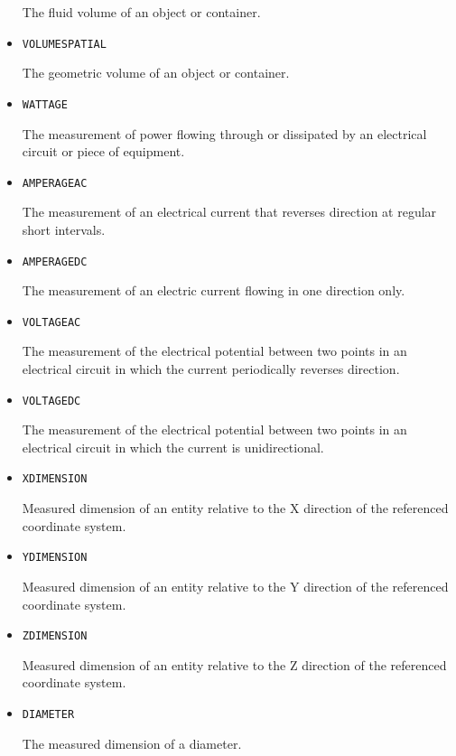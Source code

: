 \begin{itemize}
The fluid volume of an object or container.


\item \texttt{VOLUME\textunderscore SPATIAL}  

The geometric volume of an object or container.


\item \texttt{WATTAGE}  

The measurement of power flowing through or dissipated by an electrical circuit or piece of equipment.


\item \texttt{AMPERAGE\textunderscore AC}  

The measurement of an electrical current that reverses direction at regular short intervals.


\item \texttt{AMPERAGE\textunderscore DC}  

The measurement of an electric current flowing in one direction only.


\item \texttt{VOLTAGE\textunderscore AC}  

The measurement of the electrical potential between two points in an electrical circuit in which the current periodically reverses direction.


\item \texttt{VOLTAGE\textunderscore DC}  

The measurement of the electrical potential between two points in an electrical circuit in which the current is unidirectional.


\item \texttt{X\textunderscore DIMENSION}  

Measured dimension of an entity relative to the X direction of the referenced coordinate system.



\item \texttt{Y\textunderscore DIMENSION}  

Measured dimension of an entity relative to the Y direction of the referenced coordinate system.


\item \texttt{Z\textunderscore DIMENSION}  

Measured dimension of an entity relative to the Z direction of the referenced coordinate system.


\item \texttt{DIAMETER}  

The measured dimension of a diameter.



\end{itemize}
